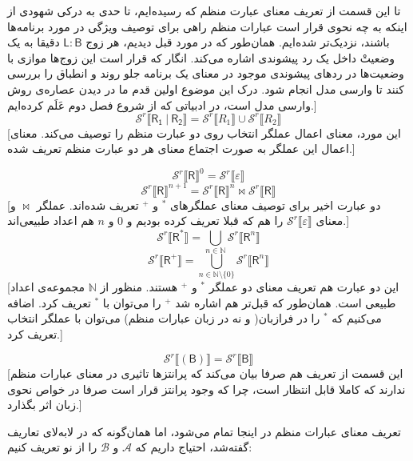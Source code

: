 \begin{defn}
تا این قسمت از تعریف معنای عبارت منظم که رسیده‌ایم، تا حدی به درکی شهودی از اینکه به چه نحوی قرار است عبارات منظم راهی برای توصیف ویژگی‌ در مورد برنامه‌ها باشند، نزدیک‌تر شده‌ایم. همان‌طور که در مورد قبل دیدیم، هر زوج 
$\mathsf{L:B}$
دقیقا به یک وضعیتْ داخل یک رد پیشوندی اشاره می‌کند. انگار که قرار است این زوج‌ها موازی با وضعیت‌ها در ردهای پیشوندی موجود در معنای یک برنامه جلو روند و انطباق را بررسی کنند تا وارسی مدل انجام شود. درک این موضوع اولین قدم ما در دیدن عصاره‌ی روش وارسی مدل است، در ادبیاتی که از شروع فصل دوم عَلَم کرده‌ایم.]
$$\mathcal{S}^r \llbracket\mathsf{R_1\:|\:R_2}\rrbracket= 
\mathcal{S}^r \llbracket R_1\rrbracket \cup
\mathcal{S}^r \llbracket R_2\rrbracket$$
[این مورد، معنای اعمال عملگر انتخاب روی دو عبارت منظم را توصیف می‌کند. معنای اعمال این عملگر به صورت اجتماع معنای هر دو عبارت منظم تعریف شده.]

$$\mathcal{S}^r \llbracket\mathsf{R}\rrbracket^0 = \mathcal{S}^r\llbracket\varepsilon\rrbracket$$
$$\mathcal{S}^r \llbracket\mathsf{R}\rrbracket^{n+1} = \mathcal{S}^r \llbracket\mathsf{R}\rrbracket^{n} \Join
\mathcal{S}^r \llbracket\mathsf{R}\rrbracket$$
[دو عبارت اخیر برای توصیف معنای عملگرهای $^*$ و $^+$ تعریف شده‌اند. عملگر $\Join$ و معنای 
$\mathcal{S}^r\llbracket\varepsilon\rrbracket$
را هم که قبلا تعریف کرده بودیم و $0$ و $n$ هم اعداد طبیعی‌اند.]
$$\mathcal{S}^r\llbracket\mathsf{R^*}\rrbracket =  \bigcup_{n \in \mathbb{N}}
\mathcal{S}^r \llbracket\mathsf{R}^n\rrbracket$$
$$\mathcal{S}^r\llbracket\mathsf{R^+}\rrbracket =  \bigcup_{n \in \mathbb{N}\setminus\{0\}}
\mathcal{S}^r \llbracket\mathsf{R}^n\rrbracket$$
[این دو عبارت هم تعریف معنای دو عملگر $^*$ و $^+$ هستند. منظور از $\mathbb{N}$ مجموعه‌ی اعداد طبیعی است. همان‌طور که قبل‌تر هم اشاره شد $^+$ را می‌توان با $^*$ تعریف کرد. اضافه می‌کنیم که $^*$ را در فرازبان( و نه در زبان عبارات منظم) می‌توان با عملگر انتخاب تعریف کرد.]

$$\mathcal{S}^r \llbracket(\mathsf{B})\rrbracket=\mathcal{S}^r \llbracket\mathsf{B}\rrbracket$$
[این قسمت از تعریف هم صرفا بیان می‌کند که پرانتزها تاثیری در معنای عبارات منظم ندارند که کاملا قابل انتظار است، چرا که وجود پرانتز قرار است صرفا در خواص نحوی زبان اثر بگذارد.]
\end{defn}
تعریف معنای عبارات منظم در اینجا تمام می‌شود، اما همان‌گونه که در لا‌به‌لای تعاریف گفته‌شد، احتیاج داریم که $\mathcal{A}$ و $\mathcal{B}$ را از نو تعریف کنیم:

